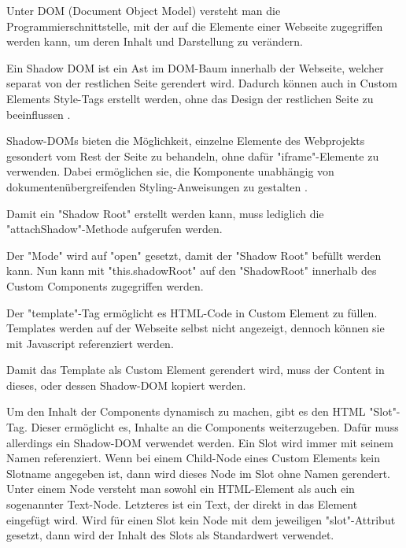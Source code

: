 \pagebreak
{}

Unter DOM (Document Object Model) versteht man die Programmierschnittstelle, mit der auf die Elemente einer Webseite zugegriffen werden kann, um deren Inhalt und Darstellung zu verändern. \cite{MDNDOM}

Ein Shadow DOM ist ein Ast im DOM-Baum innerhalb der Webseite, welcher separat von der restlichen Seite gerendert wird.
Dadurch können auch in Custom Elements Style-Tags erstellt werden, ohne das Design der restlichen Seite zu beeinflussen \cite{MDNShadowRoot}.

Shadow-DOMs bieten die Möglichkeit, einzelne Elemente des Webprojekts gesondert vom Rest der Seite zu behandeln, ohne dafür "{\ttfamily iframe}"-Elemente zu verwenden. 
Dabei ermöglichen sie, die Komponente unabhängig von dokumentenübergreifenden Styling-Anweisungen zu gestalten \cite{IONOSShadowDom}.

Damit ein "Shadow Root" erstellt werden kann, muss lediglich die "{\ttfamily attachShadow}"-Methode aufgerufen werden. \cite{MDNShadowRoot}


Der "Mode" wird auf "{\ttfamily open}" gesetzt, damit der "Shadow Root" befüllt werden kann. Nun kann mit "{\ttfamily this.shadowRoot}" auf den "ShadowRoot" innerhalb des Custom Components zugegriffen werden.
\cite{MDNShadowRoot}

\pagebreak
{}

Der "template"-Tag ermöglicht es HTML-Code in Custom Element zu füllen.
Templates werden auf der Webseite selbst nicht angezeigt, dennoch können sie mit Javascript referenziert werden. \cite{MDNtemplate}


Damit das Template als Custom Element gerendert wird, muss der Content in dieses, oder dessen Shadow-DOM kopiert werden.



Um den Inhalt der Components dynamisch zu machen, gibt es den HTML "Slot"-Tag. 
Dieser ermöglicht es, Inhalte an die Components weiterzugeben. 
Dafür muss allerdings ein Shadow-DOM verwendet werden. 
Ein Slot wird immer mit seinem Namen referenziert. 
Wenn bei einem Child-Node eines Custom Elements kein Slotname angegeben ist, dann wird dieses Node im Slot ohne Namen gerendert. 
Unter einem Node versteht man sowohl ein HTML-Element als auch ein sogenannter Text-Node. 
Letzteres ist ein Text, der direkt in das Element eingefügt wird. 
Wird für einen Slot kein Node mit dem jeweiligen "{\ttfamily slot}"-Attribut gesetzt, dann wird der Inhalt des Slots als Standardwert verwendet. 
\cite{MDNSlots}

